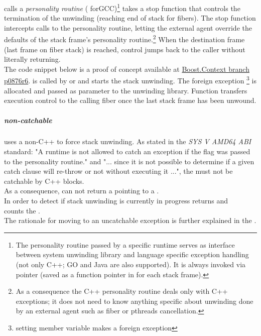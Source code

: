 \uwforced calls a \emph{personality routine} ( forGCC)\footnote{The
personality routine passed by a specific runtime serves as interface between system unwinding library
and language specific exception handling (not only C++; GO and Java are also supported). It is always invoked via pointer (saved
as a function pointer in \ehframe for each stack frame).}
\uwforced takes a stop function that controls the termination of the unwinding
(reaching end of stack for fibers).
The stop function intercepts calls to the personality routine, letting the external
agent override the defaults of the stack frame's personality routine.\footnote{As
a consequence the C++ personality routine deals only with C++ exceptions;
it does not need to know anything specific about unwinding done by an external
agent such as fiber or pthreads cancellation.}
When the destination frame (last frame on fiber
stack) is reached, control jumps back to the caller without literally returning.\\

The code snippet below is a proof of concept available at \href{https://github.com/boostorg/context/tree/p0876r6}{Boost.Context branch p0876r6}.
 is called by \unwindfib or \dtor and starts the stack unwinding.
The foreign exception \footnote{setting member variable makes  a foreign exception}
is allocated and passed as parameter to the unwinding library. Function  transfers execution control
to the calling fiber once the last stack frame has been unwound.

\subparagraph{non-catchable \foreignex}
\unwindfib uses a non-C++ \foreignex to force stack unwinding.
As stated in the \emph{SYS V AMD64 ABI}\cite{SYSVAMD64} standard:
"A runtime is not allowed to catch an exception if the  flag was passed to the personality routine."
and "... since it is not possible to determine if a given catch clause will re-throw or not without executing it ...", the
\foreignex must not be catchable by C++  blocks.\\
As a consequence, \curex can not return a  pointing to a \foreignex.\\
In order to detect if stack unwinding is currently in progress \uncex returns  and\\
\uncexs counts the \foreignex.\\

The rationale for moving to an uncatchable exception is further explained in
the .\\

